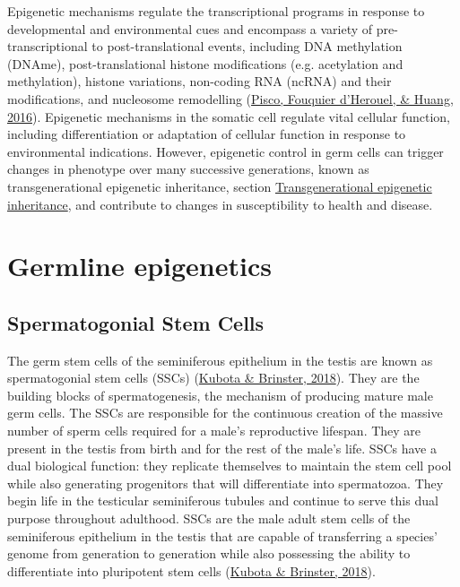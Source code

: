 \documentclass[12pt,twoside]{reedthesis}
\begin{document}
Epigenetic mechanisms regulate the transcriptional programs in response
to developmental and environmental cues and encompass a variety of
pre-transcriptional to post-translational events, including DNA
methylation (DNAme), post-translational histone modifications (e.g.
acetylation and methylation), histone variations, non-coding RNA (ncRNA)
and their modifications, and nucleosome remodelling (\protect\hyperlink{ref-pisco2016}{Pisco, Fouquier d'Herouel, \& Huang, 2016}).
Epigenetic mechanisms in the somatic cell regulate vital cellular
function, including differentiation or adaptation of cellular function
in response to environmental indications. However, epigenetic control in
germ cells can trigger changes in phenotype over many successive
generations, known as transgenerational epigenetic inheritance, section
\protect\hyperlink{tei}{Transgenerational epigenetic inheritance}, and contribute to
changes in susceptibility to health and disease.

\hypertarget{germline-epigenetics}{%
\section*{Germline epigenetics}\label{germline-epigenetics}}

\hypertarget{spermatogonial-stem-cells}{%
\subsection*{Spermatogonial Stem Cells}\label{spermatogonial-stem-cells}}

The germ stem cells of the seminiferous epithelium in the testis are
known as spermatogonial stem cells (SSCs) (\protect\hyperlink{ref-kubota2018}{Kubota \& Brinster, 2018}). They are the
building blocks of spermatogenesis, the mechanism of producing mature
male germ cells. The SSCs are responsible for the continuous creation of
the massive number of sperm cells required for a male's reproductive
lifespan. They are present in the testis from birth and for the rest of
the male's life. SSCs have a dual biological function: they replicate
themselves to maintain the stem cell pool while also generating
progenitors that will differentiate into spermatozoa. They begin life in
the testicular seminiferous tubules and continue to serve this dual
purpose throughout adulthood. SSCs are the male adult stem cells of the
seminiferous epithelium in the testis that are capable of transferring a
species' genome from generation to generation while also possessing the
ability to differentiate into pluripotent stem cells (\protect\hyperlink{ref-kubota2018}{Kubota \& Brinster, 2018}).
\end{document}

